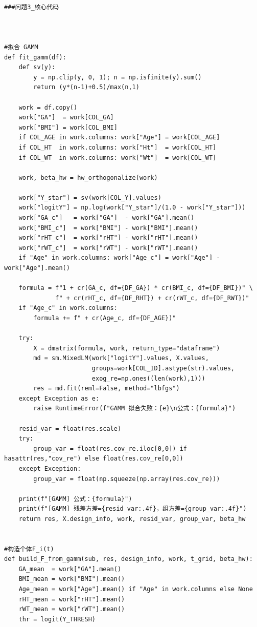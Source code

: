 \begin{lstlisting}

###问题3_核心代码



#拟合 GAMM
def fit_gamm(df):
    def sv(y):
        y = np.clip(y, 0, 1); n = np.isfinite(y).sum()
        return (y*(n-1)+0.5)/max(n,1)

    work = df.copy()
    work["GA"]  = work[COL_GA]
    work["BMI"] = work[COL_BMI]
    if COL_AGE in work.columns: work["Age"] = work[COL_AGE]
    if COL_HT  in work.columns: work["Ht"]  = work[COL_HT]
    if COL_WT  in work.columns: work["Wt"]  = work[COL_WT]

    work, beta_hw = hw_orthogonalize(work) 

    work["Y_star"] = sv(work[COL_Y].values)
    work["logitY"] = np.log(work["Y_star"]/(1.0 - work["Y_star"]))
    work["GA_c"]   = work["GA"]  - work["GA"].mean()
    work["BMI_c"]  = work["BMI"] - work["BMI"].mean()
    work["rHT_c"]  = work["rHT"] - work["rHT"].mean()
    work["rWT_c"]  = work["rWT"] - work["rWT"].mean()
    if "Age" in work.columns: work["Age_c"] = work["Age"] - work["Age"].mean()

    formula = f"1 + cr(GA_c, df={DF_GA}) * cr(BMI_c, df={DF_BMI})" \
              f" + cr(rHT_c, df={DF_RHT}) + cr(rWT_c, df={DF_RWT})"
    if "Age_c" in work.columns:
        formula += f" + cr(Age_c, df={DF_AGE})"

    try:
        X = dmatrix(formula, work, return_type="dataframe")
        md = sm.MixedLM(work["logitY"].values, X.values,
                        groups=work[COL_ID].astype(str).values,
                        exog_re=np.ones((len(work),1)))
        res = md.fit(reml=False, method="lbfgs")
    except Exception as e:
        raise RuntimeError(f"GAMM 拟合失败：{e}\n公式：{formula}")

    resid_var = float(res.scale)
    try:
        group_var = float(res.cov_re.iloc[0,0]) if hasattr(res,"cov_re") else float(res.cov_re[0,0])
    except Exception:
        group_var = float(np.squeeze(np.array(res.cov_re)))

    print(f"[GAMM] 公式：{formula}")
    print(f"[GAMM] 残差方差={resid_var:.4f}，组方差={group_var:.4f}")
    return res, X.design_info, work, resid_var, group_var, beta_hw


#构造个体F_i(t)
def build_F_from_gamm(sub, res, design_info, work, t_grid, beta_hw):
    GA_mean  = work["GA"].mean()
    BMI_mean = work["BMI"].mean()
    Age_mean = work["Age"].mean() if "Age" in work.columns else None
    rHT_mean = work["rHT"].mean()
    rWT_mean = work["rWT"].mean()
    thr = logit(Y_THRESH)


\end{lstlisting}
